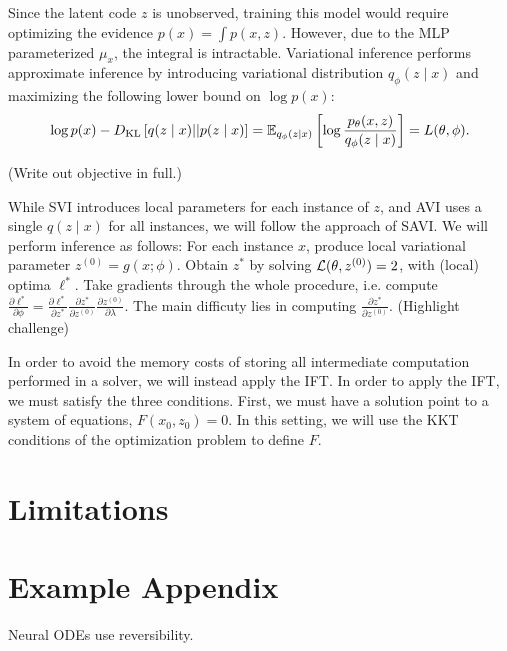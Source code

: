 \documentclass[11pt]{article}
\begin{document}
Since the latent code $z$ is unobserved, training this model would require optimizing the
evidence $p(x) = \int p(x,z)$.
However, due to the MLP parameterized $\mu_x$, the integral is intractable.
Variational inference performs approximate inference by introducing variational distribution
$q_\phi(z \mid x)$ and maximizing the following lower bound on $\log p(x)$:
\begin{equation}
    \log p(x) - D_\mathrm{KL}\left[q(z \mid x) || p(z \mid x)\right]
    = \mathbb{E}_{q_\phi(z \mid x)}\left[\log \frac{p_\theta(x,z)}{q_\phi(z\mid x)}\right] = L(\theta, \phi).
\end{equation}

(Write out objective in full.)

While SVI introduces local parameters for each instance of $z$,
and AVI uses a single $q(z \mid x)$ for all instances,
we will follow the approach of SAVI.
We will perform inference as follows:
For each instance $x$, produce local variational parameter
$z^{(0)} = g(x; \phi)$.
Obtain $z^*$ by solving $\mathcal{L}(\theta, z^{(0)}) = 2$, with (local) optima $\ell^*$.
Take gradients through the whole procedure,
i.e. compute $\frac{\partial \ell^*}{\partial \phi}
= \frac{\partial\ell^*}{\partial z^*}\frac{\partial z^*}{\partial z^{(0)}}
\frac{\partial z^{(0)}}{\partial \lambda}$.
The main difficuty lies in computing $\frac{\partial z^*}{\partial z^{(0)}}$.
(Highlight challenge)

In order to avoid the memory costs of storing all intermediate computation performed
in a solver, we will instead apply the IFT.
In order to apply the IFT, we must satisfy the three conditions.
First, we must have a solution point to a system of equations, $F(x_0, z_0) = 0$.
In this setting, we will use the KKT conditions of the optimization problem to define $F$.

\section{Limitations}



\appendix

\section{Example Appendix}
\label{sec:appendix}

Neural ODEs use reversibility.
\end{document}
